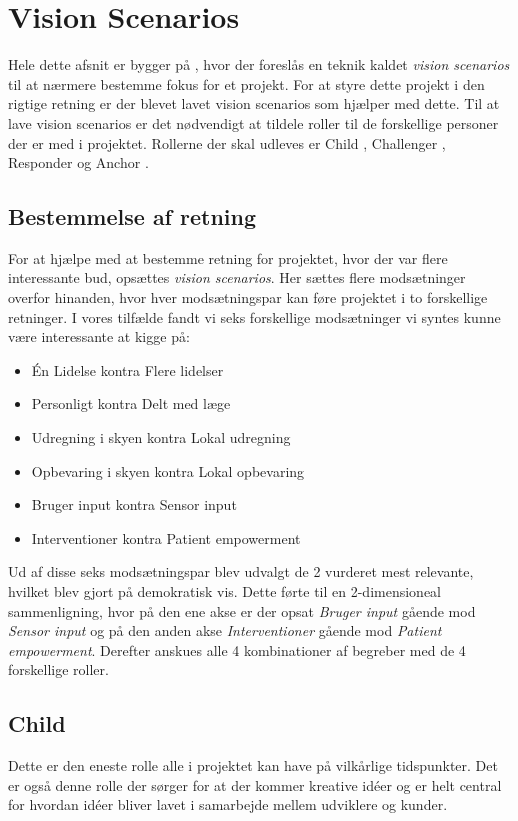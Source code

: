 \section{Vision Scenarios}
Hele dette afsnit er bygger på \citet[Sektion 17.1]{art:essence}, hvor der foreslås en teknik kaldet \textit{vision scenarios} til at nærmere bestemme fokus for et projekt.
For at styre dette projekt i den rigtige retning er der blevet lavet vision scenarios som hjælper med dette.
Til at lave vision scenarios er det nødvendigt at tildele roller til de forskellige personer der er med i projektet.
Rollerne der skal udleves er Child \citep[Kapitel 18]{art:essence}, Challenger \citep[Kapitel 19]{art:essence}, Responder \citep[Kapitel 20]{art:essence} og Anchor \citep[Kapitel 21]{art:essence}.

\subsection{Bestemmelse af retning}
For at hjælpe med at bestemme retning for projektet, hvor der var flere interessante bud, opsættes \textit{vision scenarios}.
Her sættes flere modsætninger overfor hinanden, hvor hver modsætningspar kan føre projektet i to forskellige retninger.
I vores tilfælde fandt vi seks forskellige modsætninger vi syntes kunne være interessante at kigge på:
\begin{itemize}
	\item Én Lidelse kontra Flere lidelser
	\item Personligt kontra Delt med læge
	\item Udregning i skyen kontra Lokal udregning
	\item Opbevaring i skyen kontra Lokal opbevaring
	\item Bruger input kontra Sensor input
	\item Interventioner kontra Patient empowerment
\end{itemize}

Ud af disse seks modsætningspar blev udvalgt de 2 vurderet mest relevante, hvilket blev gjort på demokratisk vis.
Dette førte til en 2-dimensioneal sammenligning, hvor på den ene akse er der opsat \textit{Bruger input} gående mod \textit{Sensor input} og på den anden akse \textit{Interventioner} gående mod \textit{Patient empowerment}.
Derefter anskues alle 4 kombinationer af begreber med de 4 forskellige roller.



\subsection{Child}
Dette er den eneste rolle alle i projektet kan have på vilkårlige tidspunkter.
Det er også denne rolle der sørger for at der kommer kreative idéer og er helt central for hvordan idéer bliver lavet i samarbejde mellem udviklere og kunder.

